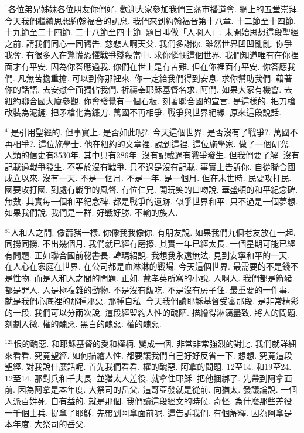 \documentclass{book}
\begin{document}
$^{1}$各位弟兄姊妹各位朋友你們好.
歡迎大家參加我們三藩市播道會.
網上的五堂崇拜.
今天我們繼續思想約翰福音的訊息.
我們來到約翰福音第十八章.
十二節至十四節.
十九節至二十四節.
二十八節至四十節.
題目叫做「人啊人」.
未開始思想這段聖經之前.
請我們同心一同禱告.
慈悲人啊天父.
我們多謝你.
雖然世界凹凹亂亂.
你爭我奪.
有很多人在驚慌恐懼戰爭殘殺當中.
求你憐憫這個世界.
我們知道唯有在你裡面才有平安.
因為你答應過我.
你們在世上是有苦難.
但在你裡面有平安.
你答應我們.
凡無苦擔重擔.
可以到你那裡來.
你一定給我們得到安息.
求你幫助我們.
藉著你的話語.
去安慰全面獨佔我們.
祈禱奉耶穌基督名求.
阿們.
如果大家有機會.
去紐約聯合國大廈參觀.
你會發覺有一個石板.
刻著聯合國的宣言.
是這樣的.
把刀槍改裝為泥鏟.
把矛槍化為鐮刀.
萬國不再相爭.
戰爭與世界絕緣.
原來這段說話.

$^{41}$是引用聖經的.
但事實上.
是否如此呢?.
今天這個世界.
是否沒有了戰爭?.
萬國不再相爭?.
這位施學士.
他在紐約的文章裡.
說到這裡.
這位施學家.
做了一個研究.
人類的信史有3530年.
其中只有286年.
沒有記載過有戰爭發生.
但我們要了解.
沒有記載過戰爭發生.
不等於沒有戰爭.
只不過是沒有記載.
事實上告訴你.
自從聯合國成立以來.
沒有一天.
不是一個月.
不是一年.
是一個月.
但在末世時.
民要攻打民.
國要攻打國.
到處有戰爭的風聲.
有位仁兄.
開玩笑的口吻說.
華盛頓的和平紀念碑.
無數.
其實每一個和平紀念碑.
都是戰爭的遺跡.
似乎世界和平.
只不過是一個夢想.
如果我們說.
我們是一群.
好戰好勝.
不輸的族人.

$^{81}$人和人之間.
像箭豬一樣.
你像我我像你.
有朋友說.
如果我們九個老友放在一起.
同撈同撈.
不出幾個月.
我們就已經有磨擦.
其實一年已經太長.
一個星期可能已經有問題.
正如聯合國前秘書長.
韓瑪紹說.
我想我永遠無法.
見到安寧和平的一天.
在人心在家庭在世界.
在公司都是血淋淋的戰場.
今天這個世界.
最需要的不是錢不是性物.
而是人和人之間的問題.
正如.
戴孝英所寫的小說.
人啊人.
我們都是箭豬.
都是罪人.
人是極複雜的動物.
不是沒有飯吃.
不是沒有房子住.
最重要的一件事.
就是我們心底裡的那種邪惡.
那種自私.
今天我們讀耶穌基督受審那段.
是非常精彩的一段.
我們可以分兩次說.
這段經盟約人性的醜陋.
描繪得淋漓盡致.
將人的問題.
刻劃入微.
權的醜惡.
黑白的醜惡.
權的醜惡.

$^{121}$恨的醜惡.
和耶穌基督的愛和權柄.
變成一個.
非常非常強烈的對比.
我們就詳細來看看.
究竟聖經.
如何描繪人性.
都要讓我們自己好好反省一下.
想想.
究竟這段聖經.
對我說什麼話呢.
首先我們看看.
權的醜惡.
阿拿的問題.
12至14.
和19至24.
12至14.
那對兵和千夫長.
並猶太人差役.
就拿住耶穌.
把他捆綁了.
先帶到阿拿面前.
因為阿拿是本年度.
大祭司的岳父.
這哥亞發就是從前.
向猶太.
發議論說.
一個人派百姓死.
自有益的.
就是那個.
我們讀這段經文的時候.
奇怪.
為什麼那些差役.
一千個士兵.
捉拿了耶穌.
先帶到阿拿面前呢.
這告訴我們.
有個解釋.
因為阿拿是本年度.
大祭司的岳父.
\end{document}
